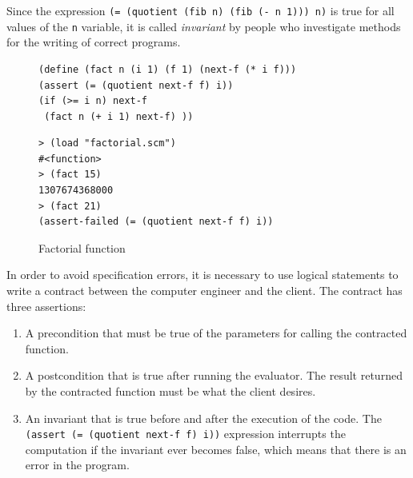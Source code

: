 \documentclass[a4paper,12pt]{book}
\newenvironment{fmpage}[1]
           {\begin{lrbox}{\fmbox}\begin{minipage}{#1}}
           {\end{minipage}\end{lrbox}\fbox{\usebox{\fmbox}}}
\begin{document}
Since the
expression \verb|(= (quotient (fib n) (fib (- n 1))) n)|
is true for all values of the \verb|n| variable,
it is called {\em invariant} by people
who investigate methods for the writing of correct
programs.

\begin{figure}[!h]
\begin{fmpage}{0.8\linewidth}
\begin{verbatim}
(define (fact n (i 1) (f 1) (next-f (* i f)))
(assert (= (quotient next-f f) i))
(if (>= i n) next-f
 (fact n (+ i 1) next-f) ))
\end{verbatim}
\end{fmpage}

\begin{fmpage}{0.8\linewidth}
\begin{verbatim}
> (load "factorial.scm")
#<function>
> (fact 15)
1307674368000
> (fact 21)
(assert-failed (= (quotient next-f f) i))
\end{verbatim}
\end{fmpage}
\caption{Factorial function}
\label{loop-invariant/fact}
\end{figure}

In order to avoid specification errors,
it is necessary to use logical statements
to write a contract between the computer
engineer and the client. The contract has
three assertions:
\begin{enumerate}
\item A precondition that must be true
of the parameters for calling the contracted function.
\item A postcondition that is true after running
the evaluator. The result returned by the
contracted function must be what the client desires.
\item An invariant that is
true before and after the execution of the code.  
The \verb|(assert (= (quotient next-f f) i))|
expression interrupts the computation if
the invariant ever becomes false, which
means that there is an error in the program.
\end{enumerate}
\end{document}
